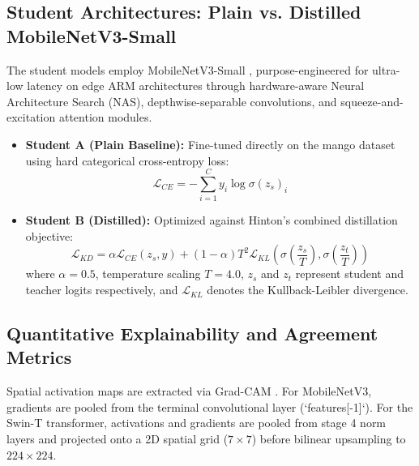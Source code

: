 \documentclass[journal,10pt,twocolumn]{article}
\begin{document}
\subsection{Student Architectures: Plain vs. Distilled MobileNetV3-Small}
The student models employ MobileNetV3-Small \cite{howard2019searching}, purpose-engineered for ultra-low latency on edge ARM architectures through hardware-aware Neural Architecture Search (NAS), depthwise-separable convolutions, and squeeze-and-excitation attention modules. 
\begin{itemize}
    \item \textbf{Student A (Plain Baseline):} Fine-tuned directly on the mango dataset using hard categorical cross-entropy loss:
    \begin{equation}
        \mathcal{L}_{CE} = -\sum_{i=1}^{C} y_i \log \sigma(z_s)_i
    \end{equation}
    \item \textbf{Student B (Distilled):} Optimized against Hinton's combined distillation objective:
    \begin{equation}
        \mathcal{L}_{KD} = \alpha \mathcal{L}_{CE}(z_s, y) + (1-\alpha) T^2 \mathcal{L}_{KL}\left(\sigma\left(\frac{z_s}{T}\right), \sigma\left(\frac{z_t}{T}\right)\right)
    \end{equation}
    where $\alpha = 0.5$, temperature scaling $T = 4.0$, $z_s$ and $z_t$ represent student and teacher logits respectively, and $\mathcal{L}_{KL}$ denotes the Kullback-Leibler divergence.
\end{itemize}

\subsection{Quantitative Explainability and Agreement Metrics}
Spatial activation maps are extracted via Grad-CAM \cite{selvaraju2017grad}. For MobileNetV3, gradients are pooled from the terminal convolutional layer (`features[-1]`). For the Swin-T transformer, activations and gradients are pooled from stage 4 norm layers and projected onto a 2D spatial grid ($7 \times 7$) before bilinear upsampling to $224 \times 224$.
\end{document}
